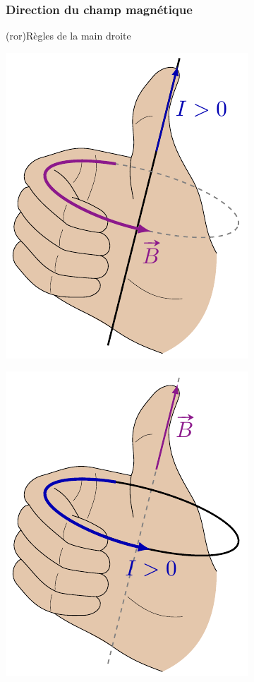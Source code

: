 \documentclass[../../main/main.tex]{subfiles}
\begin{document}
\subsubsection{Direction du champ magnétique}
\label{sssec:chpdir}
\begin{tcb*}(ror){Règles de la main droite}
	\begin{minipage}[t]{.45\linewidth}
		\begin{center}
			\includegraphics[width=.5\linewidth]{ra_fil}
			\label{fig:rafil}
		\end{center}
	\end{minipage}
	\hfill
	\begin{minipage}[t]{.45\linewidth}
		\begin{center}
			\includegraphics[width=.5\linewidth]{ra_bob}
			\label{fig:rabob}
		\end{center}
	\end{minipage}
\end{tcb*}
\end{document}
